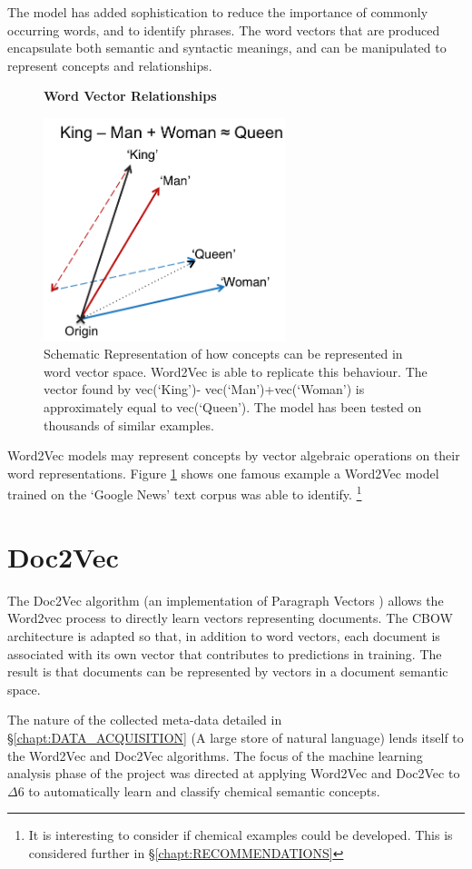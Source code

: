 The model has added sophistication to reduce the importance of commonly occurring words, and to identify phrases. The word vectors that are produced encapsulate both semantic and syntactic meanings, and can be manipulated to represent concepts and relationships.
\begin{figure}[H]
    \centering
    \textbf{Word Vector Relationships}\par\medskip
    \includegraphics[height=6.5cm]{Natural_Language_Processing/KINGQUEEN.png}
    \caption[Word Vector Relationships]{Schematic Representation of how concepts can be represented in word vector space. Word2Vec is able to replicate this behaviour. The vector found by vec(‘King’)- vec(‘Man’)+vec(‘Woman’) is approximately equal to vec(‘Queen’). The model has been tested on thousands of similar examples\cite{word2vec2}\cite{word2veckingqueen}.}
     \label{fig:KINGQUEEN}
\end{figure}
Word2Vec models may represent concepts by vector algebraic operations on their word representations. Figure \ref{fig:KINGQUEEN} shows one famous example a Word2Vec model trained on the `Google News' text corpus was able to identify. \footnote{It is interesting to consider if chemical examples could be developed. This is considered further in \S\ref{chapt:RECOMMENDATIONS}}

\section{Doc2Vec}
The Doc2Vec algorithm\cite{gensim} (an implementation of Paragraph Vectors \cite{doc2vec}) allows the Word2vec process to directly learn vectors representing documents. The CBOW architecture is adapted so that, in addition to word vectors, each document is associated with its own vector that contributes to predictions in training. The result is that documents can be represented by vectors in a document semantic space.

The nature of the collected meta-data detailed in \S\ref{chapt:DATA_ACQUISITION} (A large store of natural language) lends itself to the Word2Vec and Doc2Vec algorithms. The focus of the machine learning analysis phase of the project was directed at applying Word2Vec and Doc2Vec to $\Delta6$ to automatically learn and classify chemical semantic concepts.
